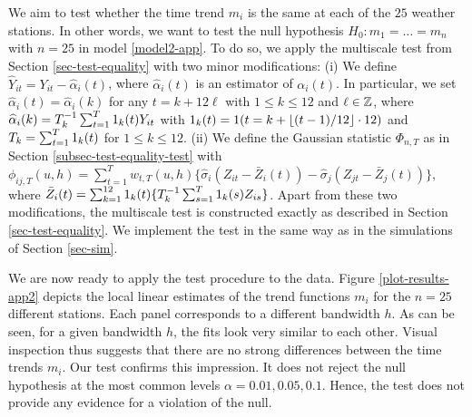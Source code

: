 We aim to test whether the time trend $m_i$ is the same at each of the $25$ weather stations. In other words, we want to test the null hypothesis $H_0: m_1 = \ldots = m_n$ with $n = 25$ in model \eqref{model2-app}. To do so, we apply the multiscale test from Section \ref{sec-test-equality} with two minor modifications: (i) We define $\widehat{Y}_{it} = Y_{it} - \widehat{\alpha}_i(t)$, where $\widehat{\alpha}_i(t)$ is an estimator of $\alpha_i(t)$. In particular, we set $\widehat{\alpha}_i(t) = \widehat{\alpha}_i(k)$ for any $t = k + 12 \ell$ with $1 \le k \le 12$ and $\ell \in \mathbb{Z}$, where $\widehat{\alpha}_i(k) = T_k^{-1} \sum_{t = 1}^T 1_k(t) Y_{it}$ with $1_k(t) = 1(t = k + \lfloor (t-1)/12 \rfloor \cdot 12)$ and $T_k = \sum_{t=1}^T 1_k(t)$ for $1 \le k \le 12$. (ii) We define the Gaussian statistic $\Phi_{n,T}$ as in Section \ref{subsec-test-equality-test} with $\phi_{ij,T}(u,h) = \sum_{t=1}^T w_{t,T}(u,h) \{ \widehat{\sigma}_i (Z_{it} - \bar{Z}_i(t)) - \widehat{\sigma}_j (Z_{jt} - \bar{Z}_j(t))\}$, where $\bar{Z}_i(t) = \sum_{k=1}^{12} 1_k(t) \{ T_k^{-1} \sum_{s = 1}^T 1_k(s) Z_{is} \}$. Apart from these two modifications, the multiscale test is constructed exactly as described in Section \ref{sec-test-equality}. We implement the test in the same way as in the simulations of Section \ref{sec-sim}. 


We are now ready to apply the test procedure to the data. Figure \ref{plot-results-app2} depicts the local linear estimates of the trend functions $m_i$ for the $n=25$ different stations. Each panel corresponds to a different bandwidth $h$. As can be seen, for a given bandwidth $h$, the fits look very similar to each other. Visual inspection thus suggests that there are no strong differences between the time trends $m_i$. Our test confirms this impression. It does not reject the null hypothesis at the most common levels $\alpha = 0.01, 0.05, 0.1$. Hence, the test does not provide any evidence for a violation of the null. %

